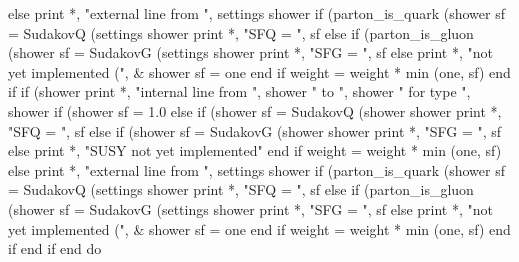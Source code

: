           else
             print *, "external line from ", settings%
                  shower%
             if (parton_is_quark (shower%
                sf = SudakovQ (settings%
                     shower%
                print *, "SFQ = ", sf
             else if (parton_is_gluon (shower%
                sf = SudakovG (settings%
                     shower%
                print *, "SFG = ", sf
             else
                print *, "not yet implemented (", &
                     shower%
                sf = one
             end if
             weight = weight * min (one, sf)
          end if
          if (shower%
             print *, "internal line from ", shower%
                  " to ", shower%
                  " for type ", shower%
             if (shower%
                sf = 1.0
             else if (shower%
                sf = SudakovQ (shower%
                     shower%
                print *, "SFQ = ", sf
             else if (shower%
                sf = SudakovG (shower%
                     shower%
                print *, "SFG = ", sf
             else
                print *, "SUSY not yet implemented"
             end if
             weight = weight * min (one, sf)
          else
             print *, "external line from ", settings%
                  shower%
             if (parton_is_quark (shower%
                sf = SudakovQ (settings%
                     shower%
                print *, "SFQ = ", sf
             else if (parton_is_gluon (shower%
                sf = SudakovG (settings%
                     shower%
                print *, "SFG = ", sf
             else
                print *, "not yet implemented (", &
                     shower%
                sf = one
             end if
             weight = weight * min (one, sf)
          end if
       end if
    end do

